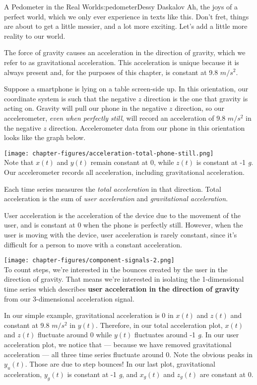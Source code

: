 \begin{aosachapter}{A Pedometer in the Real World}{s:pedometer}{Dessy Daskalov}
Ah, the joys of a perfect world, which we only ever experience in texts
like this. Don't fret, things are about to get a little messier, and a
lot more exciting. Let's add a little more reality to our world.

\label{even-perfect-worlds-have-fundamental-forces-of-nature}

The force of gravity causes an acceleration in the direction of gravity,
which we refer to as gravitational acceleration. This acceleration is
unique because it is always present and, for the purposes of this
chapter, is constant at 9.8 $m/s^2$.

Suppose a smartphone is lying on a table screen-side up. In this
orientation, our coordinate system is such that the negative $z$
direction is the one that gravity is acting on. Gravity will pull our
phone in the negative $z$ direction, so our accelerometer, \emph{even
when perfectly still}, will record an acceleration of 9.8 $m/s^2$ in the
negative $z$ direction. Accelerometer data from our phone in this
orientation looks like the graph below.

\texttt{[image: chapter-figures/acceleration-total-phone-still.png]}\\
Note that $x(t)$ and $y(t)$ remain constant at 0, while $z(t)$ is
constant at -1 \emph{g}. Our accelerometer records all acceleration,
including gravitational acceleration.

Each time series measures the \emph{total acceleration} in that
direction. Total acceleration is the sum of \emph{user acceleration} and
\emph{gravitational acceleration}.

User acceleration is the acceleration of the device due to the movement
of the user, and is constant at 0 when the phone is perfectly still.
However, when the user is moving with the device, user acceleration is
rarely constant, since it's difficult for a person to move with a
constant acceleration.

\texttt{[image: chapter-figures/component-signals-2.png]}\\ To count
steps, we're interested in the bounces created by the user in the
direction of gravity. That means we're interested in isolating the
1-dimensional time series which describes \textbf{user acceleration in
the direction of gravity} from our 3-dimensional acceleration signal.

In our simple example, gravitational acceleration is 0 in $x(t)$ and
$z(t)$ and constant at 9.8 $m/s^2$ in $y(t)$. Therefore, in our total
acceleration plot, $x(t)$ and $z(t)$ fluctuate around 0 while $y(t)$
fluctuates around -1 \emph{g}. In our user acceleration plot, we notice
that --- because we have removed gravitational acceleration --- all
three time series fluctuate around 0. Note the obvious peaks in
$y_{u}(t)$. Those are due to step bounces! In our last plot,
gravitational acceleration, $y_{g}(t)$ is constant at -1 \emph{g}, and
$x_{g}(t)$ and $z_{g}(t)$ are constant at 0.


\end{aosachapter}
